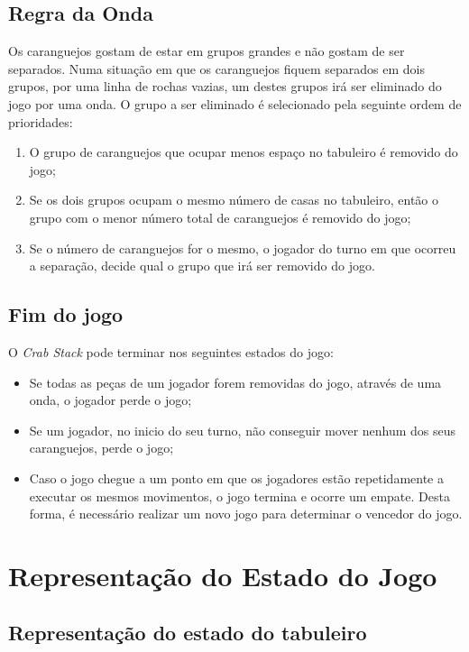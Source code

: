 \documentclass[a4paper]{article}
\begin{document}
\subsection{Regra da Onda}
Os caranguejos gostam de estar em grupos grandes e não gostam de ser separados. Numa situação em que os caranguejos fiquem separados em dois grupos, por uma linha de rochas vazias, um destes grupos irá ser eliminado do jogo por uma onda. O grupo a ser eliminado é selecionado pela seguinte ordem de prioridades:
\begin{enumerate}
\item O grupo de caranguejos que ocupar menos espaço no tabuleiro é removido do jogo;
\item Se os dois grupos ocupam o mesmo número de casas no tabuleiro, então o grupo com o menor número total de caranguejos é removido do jogo;
\item Se o número de caranguejos for o mesmo, o jogador do turno em que ocorreu a separação, decide qual o grupo que irá ser removido do jogo.
\end{enumerate}

\subsection{Fim do jogo}

O \textit{Crab Stack} pode terminar nos seguintes estados do jogo:
\begin{itemize}
\item Se todas as peças de um jogador forem removidas do jogo, através de uma onda, o jogador perde o jogo;
\item Se um jogador, no inicio do seu turno, não conseguir mover nenhum dos seus caranguejos, perde o jogo;
\item Caso o jogo chegue a um ponto em que os jogadores estão repetidamente a executar os mesmos movimentos, o jogo termina e ocorre um empate. Desta forma, é necessário realizar um novo jogo para determinar o vencedor do jogo.
\end{itemize}

\newpage
\section{Representação do Estado do Jogo}

\subsection{Representação do estado do tabuleiro}
\end{document}
